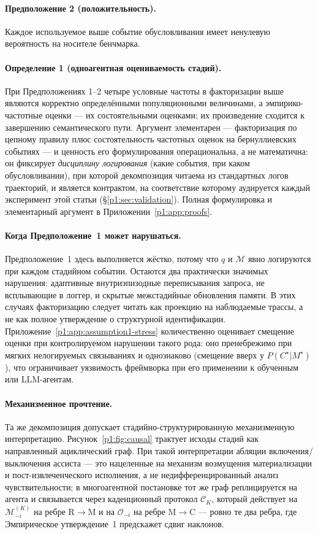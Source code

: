 \documentclass{article}
\begin{document}
\paragraph{Предположение 2 (положительность).}
Каждое используемое выше событие обусловливания имеет ненулевую вероятность на
носителе бенчмарка.

\paragraph{Определение 1 (одноагентная оцениваемость стадий).}
При Предположениях 1--2 четыре условные частоты в факторизации выше являются корректно определёнными популяционными величинами, а эмпирико-частотные оценки --- их состоятельными оценками; их произведение сходится к завершению семантического пути. Аргумент элементарен --- факторизация по цепному правилу плюс состоятельность частотных оценок на бернуллиевских событиях --- и ценность его формулирования операциональна, а не математична: он фиксирует \emph{дисциплину логирования} (какие события, при каком обусловливании), при которой декомпозиция читаема из стандартных логов траекторий, и является контрактом, на соответствие которому аудируется каждый эксперимент этой статьи (\S\ref{p1:sec:validation}). Полная формулировка и элементарный аргумент в Приложении~\ref{p1:app:proofs}.

\paragraph{Когда Предположение~1 может нарушаться.}
Предположение~1 здесь выполняется жёстко, потому что $q$ и $\mathcal{M}$
явно логируются при каждом стадийном событии. Остаются два практически значимых
нарушения: адаптивные внутриэпизодные переписывания запроса, не всплывающие в
логгер, и скрытые межстадийные обновления памяти. В этих случаях
факторизацию следует читать как проекцию на наблюдаемые
трассы, а не как полное утверждение о структурной идентификации.
Приложение~\ref{p1:app:assumption1-stress} количественно оценивает смещение оценки
при контролируемом нарушении такого рода: оно пренебрежимо при мягких
нелогируемых связываниях и однознаково (смещение вверх у
$P(C^\star|M^\star)$), что ограничивает уязвимость фреймворка при его
применении к обученным или LLM-агентам.

\paragraph{Механизменное прочтение.}
Та же декомпозиция допускает стадийно-структурированную механизменную
интерпретацию. Рисунок~\ref{p1:fig:causal} трактует исходы стадий как
направленный ациклический граф. При такой интерпретации абляции включения/выключения
ассиста --- это нацеленные на механизм возмущения материализации и
пост-извлеченческого исполнения, а не недифференцированный анализ
чувствительности; в многоагентной постановке тот же граф реплицируется на
агента и связывается через каденционный протокол $\mathcal{C}_K$,
который действует на $\mathcal{M}_{-i}^{(K)}$ на ребре R$\to$M и на
$\mathcal{O}_{-i}$ на ребре M$\to$C --- ровно те два ребра, где
Эмпирическое утверждение~1 предскажет сдвиг наклонов.
\end{document}
